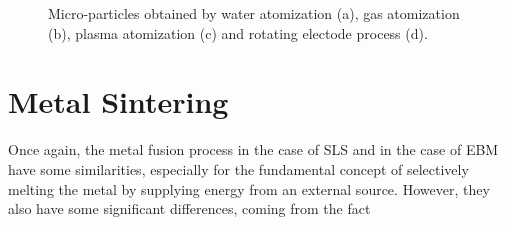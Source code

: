\begin{figure}[H]
    \qquad
    
    \caption[Powders from atomization processes]{Micro-particles obtained by water atomization (a), gas atomization (b), plasma atomization (c) and rotating electode process (d).}
    \label{fig:powders}
\end{figure}


\section{Metal Sintering}
\label{sec:metalsintering}
Once again, the metal fusion process in the case of SLS and in the case of EBM have some similarities, especially for the fundamental concept of selectively melting the metal by supplying energy from an external source. However, they also have some significant differences, coming from the fact 

